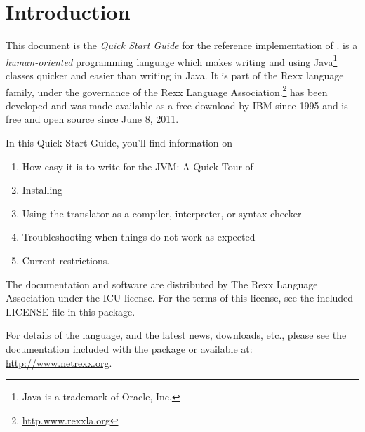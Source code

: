 \chapter{Introduction}
This document is the \emph{Quick Start Guide} for the reference implementation of
\nr{}. \nr{} is a \emph{human-oriented} programming language which makes
writing and using Java\footnote{Java is a trademark of Oracle, Inc.}
classes quicker and easier than writing in Java. It is part of the Rexx
language family, under the governance of the Rexx Language
Association.\footnote{\url{http.www.rexxla.org}} \nr{} has been
developed and was made available as a free download by IBM since 1995
and is free and open source since June 8, 2011.

In this Quick Start Guide, you’ll find information on
\begin{enumerate} 
\item How easy it is to write for the JVM: A Quick Tour of \nr{}
\item Installing \nr{} 
\item Using the \nr{} translator as a compiler, interpreter, or
  syntax checker 
\item Troubleshooting when things do not work as expected
\item Current restrictions.
\end{enumerate} 
The \nr{} documentation and software are distributed
by The Rexx Language Association under the \textsc{ICU} license. For
the terms of this license, see the included \textsc{LICENSE} file in
this package.

For details of the \nr{} language, and the latest news, downloads,
etc., please see the \nr{} documentation included with the package
or available at: \url{http://www.netrexx.org}.
